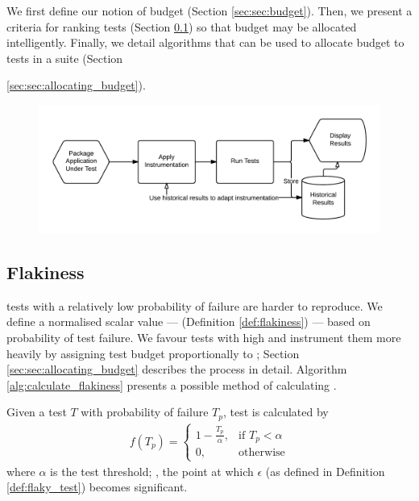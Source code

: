 We first define our notion of budget (Section \ref{sec:sec:budget}). Then, we
present a criteria for ranking \flaky tests (Section \ref{sec:sec:flakiness}) so
that budget may be allocated intelligently. Finally, we detail algorithms that
can be used to allocate budget to tests in a suite (Section
{\ref{sec:sec:allocating_budget}).

\begin{figure}[h]

\includegraphics[width=\linewidth]{Images/architecture_overview}

\caption{}
\label{fig:architecture_overview}
\end{figure}


\subsection{Flakiness}
\label{sec:sec:flakiness}

\Flaky tests with a relatively low probability of failure are harder to
reproduce. We define a normalised scalar value --- \emph{\flakiness} (Definition
\ref{def:flakiness}) --- based on probability of test failure. We favour tests
with high \flakiness and instrument them more heavily by assigning \flaky test
budget proportionally to \flakiness; Section \ref{sec:sec:allocating_budget}
describes the process in detail. Algorithm \ref{alg:calculate_flakiness}
presents a possible method of calculating \flakiness.

\begin{defn}[\Flakiness]
\label{def:flakiness}

Given a test $T$ with probability of failure $T_{p}$, test \flakiness is
calculated by
\begin{align*}
  f(T_{p})=
	\begin{cases}
	    1 - \frac{T_{p}}{\alpha},& \text{if } T_{p}< \alpha\\
	    0,              & \text{otherwise}
	\end{cases}
\end{align*}
where $\alpha$ is the \flaky test threshold; \ie, the point at which $\epsilon$
(as defined in Definition \ref{def:flaky_test}) becomes significant.


\end{defn}}
